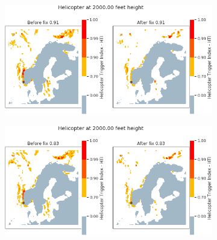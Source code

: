 \begin{figure}[H]
    \begin{subfigure}{0.45\textwidth}
    \centering
    \includegraphics[width=\textwidth]{Figures/26.png}
    \caption{}
    \label{fig:HTI26}
    \end{subfigure}
\hfill
    \begin{subfigure}{0.45\textwidth}
    \centering
    \includegraphics[width=\textwidth]{Figures/27.png}
    \caption{}
    \label{fig:HTI27}
    \end{subfigure}


\end{figure}
